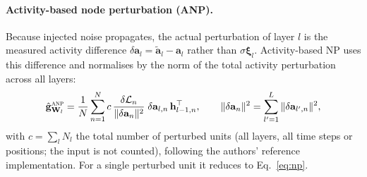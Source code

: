 \documentclass{article}
\newcommand{\method}[1]{\textsc{#1}}
\newcommand{\ANP}{\method{anp}}
\newcommand{\ghat}{\hat{\mathbf{g}}}
\newcommand{\bxi}{\boldsymbol{\xi}}
\newcommand{\bh}{\mathbf{h}}
\newcommand{\ba}{\mathbf{a}}
\newcommand{\bW}{\mathbf{W}}
\newcommand{\dL}{\delta\mathcal{L}}
\begin{document}
\paragraph{Activity-based node perturbation (ANP).}
Because injected noise propagates, the actual perturbation of layer $l$ is the measured
activity difference $\delta\ba_l=\tilde{\ba}_l-\ba_l$ rather than $\sigma\bxi_l$.
Activity-based NP \citep{dalm2023} uses this difference and normalises by the norm of
the total activity perturbation across all layers:
\begin{equation}
  \ghat_{\bW_l}^{\ANP}=\frac{1}{N}\sum_{n=1}^{N}
    c\,\frac{\dL_n}{\|\delta\ba_n\|^{2}}\;\delta\ba_{l,n}\,\bh_{l-1,n}^{\top},
  \qquad
  \|\delta\ba_n\|^{2}=\sum_{l'=1}^{L}\|\delta\ba_{l',n}\|^{2},
  \label{eq:anp}
\end{equation}
with $c=\sum_l N_l$ the total number of perturbed units (all layers, all time steps or
positions; the input is not counted), following the authors' reference implementation.
For a single perturbed unit it reduces to Eq.~\eqref{eq:np}.
\end{document}
